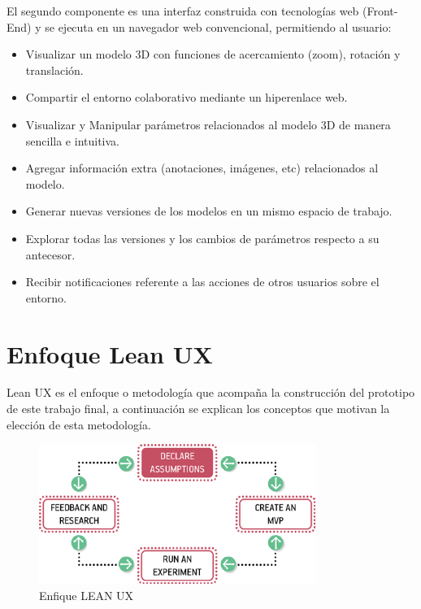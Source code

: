 El segundo componente es una interfaz construida con tecnologías web (Front-End) y se ejecuta en un navegador web convencional, permitiendo al usuario:
\begin{itemize}
  \item Visualizar un modelo 3D con funciones de acercamiento (zoom), rotación y translación.
  \item Compartir el entorno colaborativo mediante un hiperenlace web.
  \item Visualizar y Manipular parámetros relacionados al modelo 3D de manera sencilla e intuitiva.
  \item Agregar información extra (anotaciones, imágenes, etc) relacionados al modelo.
  \item Generar nuevas versiones de los modelos en un mismo espacio de trabajo.
  \item Explorar todas las versiones y los cambios de parámetros respecto a su antecesor.
  \item Recibir notificaciones referente a las acciones de otros usuarios sobre el entorno.
 
\end{itemize}

\section{Enfoque Lean UX}

Lean UX \cite{Gothelf2013} es el enfoque o metodología que acompaña la construcción del prototipo de este trabajo final, a continuación se explican los conceptos que motivan la elección de esta metodología.


\begin{figure}
\centering
\includegraphics[width=9cm]{Img/UX/UX-0.png}
\caption[(optional short caption)]{\label{us_figure} Enfique LEAN UX}
\end{figure}

